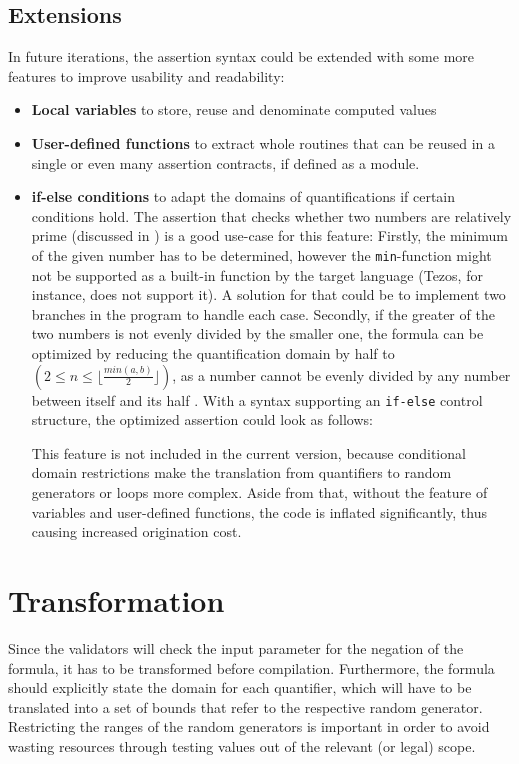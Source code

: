 \subsection{Extensions}
In future iterations, the assertion syntax could be extended with some more features to improve usability and readability:
\begin{itemize}
\item \textbf{Local variables} to store, reuse and denominate computed values
\item \textbf{User-defined functions} to extract whole routines that can be reused in a single or even many assertion contracts, if defined as a module.
\item \textbf{if-else conditions} to adapt the domains of quantifications if certain conditions hold. The assertion that checks whether two numbers are relatively prime (discussed in ) is a good use-case for this feature: Firstly, the minimum of the given number has to be determined, however the \texttt{min}-function might not be supported as a built-in function by the target language (Tezos, for instance, does not support it). A solution for that could be to implement two branches in the program to handle each case. Secondly, if the greater of the two numbers is not evenly divided by the smaller one, the formula can be optimized by reducing the quantification domain by half to $(2 \le n \le \lfloor \frac{min(a,b)}{2} \rfloor)$, as a number cannot be evenly divided by any number between itself and its half \cite{bernhardt_veigel_2020}. With a syntax supporting an \texttt{if-else} control structure, the optimized assertion could look as follows:

This feature is not included in the current version, because conditional domain restrictions make the translation from quantifiers to random generators or loops more complex. Aside from that, without the feature of variables and user-defined functions, the code is inflated significantly, thus causing increased origination cost.
\end{itemize}

\section{Transformation}\label{sec:transformation}
Since the validators will check the input parameter for the negation of the formula, it has to be transformed before compilation. Furthermore, the formula should explicitly state the domain for each quantifier, which will have to be translated into a set of bounds that refer to the respective random generator. Restricting the ranges of the random generators is important in order to avoid wasting resources through testing values out of the relevant (or legal) scope.

